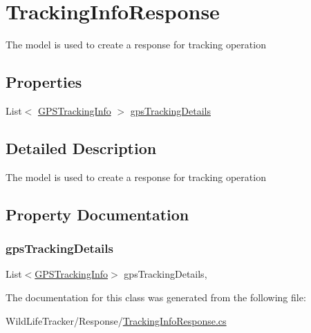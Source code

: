 \hypertarget{classWildLifeTracker_1_1Response_1_1TrackingInfoResponse}{}\section{Tracking\+Info\+Response}
\label{classWildLifeTracker_1_1Response_1_1TrackingInfoResponse}


The model is used to create a response for tracking operation  


\subsection*{Properties}
\begin{DoxyCompactItemize}
\item 
List$<$ \hyperlink{classWildLifeTracker_1_1Models_1_1GPSTrackingInfo}{G\+P\+S\+Tracking\+Info} $>$ \hyperlink{classWildLifeTracker_1_1Response_1_1TrackingInfoResponse_a10d74e08741c172f7ae042149bf3147c}{gps\+Tracking\+Details}
\end{DoxyCompactItemize}


\subsection{Detailed Description}
The model is used to create a response for tracking operation 



\subsection{Property Documentation}
\mbox{\label{classWildLifeTracker_1_1Response_1_1TrackingInfoResponse_a10d74e08741c172f7ae042149bf3147c}} 
\subsubsection{\texorpdfstring{gps\+Tracking\+Details}{gpsTrackingDetails}}
{\footnotesize\ttfamily List$<$\hyperlink{classWildLifeTracker_1_1Models_1_1GPSTrackingInfo}{G\+P\+S\+Tracking\+Info}$>$ gps\+Tracking\+Details\hspace{0.3cm}{\ttfamily [get]}, {\ttfamily [set]}}



The documentation for this class was generated from the following file\+:\begin{DoxyCompactItemize}
\item 
Wild\+Life\+Tracker/\+Response/\hyperlink{TrackingInfoResponse_8cs}{Tracking\+Info\+Response.\+cs}\end{DoxyCompactItemize}
